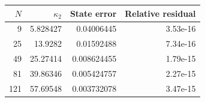 \begin{tabular}{rrrr}\toprule $N$ & $\kappa_2$ & State error & Relative residual\\\midrule
9 & 5.828427 & 0.04006445 & 3.53e-16\\
25 & 13.9282 & 0.01592488 & 7.34e-16\\
49 & 25.27414 & 0.008624455 & 1.79e-15\\
81 & 39.86346 & 0.005424757 & 2.27e-15\\
121 & 57.69548 & 0.003732078 & 3.47e-15\\
\bottomrule\end{tabular}

